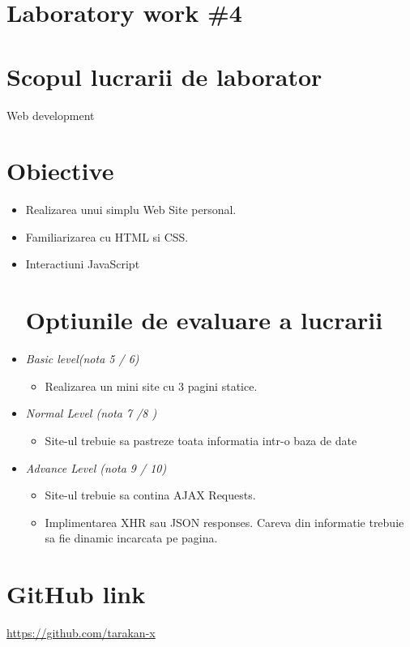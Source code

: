 \section*{Laboratory work \#4}

\section{Scopul lucrarii de laborator}
Web development
\section{Obiective}
\begin{itemize}
\item Realizarea unui simplu Web Site personal.
\item Familiarizarea cu HTML si CSS.
\item Interactiuni JavaScript
\section{Optiunile de evaluare a lucrarii}
\end{itemize}
\begin{center}
\begin{itemize}
\item \textit{Basic level(nota 5 / 6)}
\begin{itemize}
\item Realizarea un mini site cu 3 pagini statice.
\end{itemize}
\item \textit{Normal Level (nota 7 /8 )}
\begin{itemize}
\item Site-ul trebuie sa pastreze toata informatia intr-o baza de date
\end{itemize}
\item \textit{Advance Level (nota 9 / 10)}
\begin{itemize}
\item Site-ul trebuie sa contina AJAX Requests.
\item Implimentarea XHR sau JSON responses. Careva din informatie trebuie sa fie dinamic incarcata pe pagina.
\end{itemize}
\end{itemize}
\end{center}
\section{GitHub link}
\url{https://github.com/tarakan-x}

\clearpage